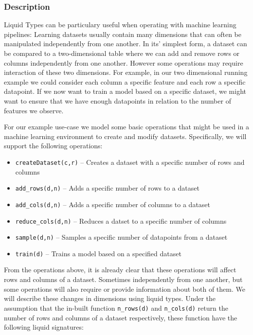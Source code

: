 \subsubsection{Description}
\label{sssec:uc2_description}

Liquid Types can be particulary useful when operating with machine learning pipelines: Learning datasets usually contain many dimensions that can often be manipulated independently from one another. In its' simplest form, a dataset can be compared to a two-dimensional table where we can add and remove rows or columns independently from one another. However some operations may require interaction of these two dimensions. For example, in our two dimensional running example we could consider each column a specific feature and each row a specific datapoint. If we now want to train a model based on a specific dataset, we might want to ensure that we have enough datapoints in relation to the number of features we observe.

For our example use-case we model some basic operations that might be used in a machine learning environment to create and modify datasets. Specifically, we will support the following operations:
\begin{itemize}
	\item \texttt{createDataset(c,r)} -- Creates a dataset with a specific number of rows and columns
	\item \texttt{add\_rows(d,n)} -- Adds a specific number of rows to a dataset
	\item \texttt{add\_cols(d,n)} -- Adds a specific number of columns to a dataset
	\item \texttt{reduce\_cols(d,n)} -- Reduces a datset to a specific number of columns
	\item \texttt{sample(d,n)} -- Samples a specific number of datapoints from a dataset
	\item \texttt{train(d)} -- Trains a model based on a specified dataset
\end{itemize}

From the operations above, it is already clear that these operations will affect rows and columns of a dataset. Sometimes independently from one another, but some operations will also require or provide information about both of them. We will describe these changes in dimensions using liquid types. Under the assumption that the in-built function \texttt{n\_rows(d)} and \texttt{n\_cols(d)} return the number of rows and columns of a dataset respectively, these function have the following liquid signatures:


